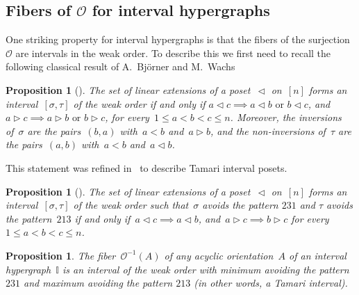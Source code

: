 \documentclass{amsart}
\newtheorem{proposition}[theorem]{Proposition}
\theoremstyle{definition}
\newcommand{\less}{\vartriangleleft} %
\newcommand{\more}{\vartriangleright} %
\newcommand{\Or}{\mathcal O}  %
\newcommand{\II}{\mathbb I} %
\begin{document}

\subsection{Fibers of $\Or$ for interval hypergraphs} 
\label{subsec:preimageI}

One striking property for interval hypergraphs is that the fibers of the surjection~$\Or$ are intervals in the weak order.
To describe this we first need to recall the following classical result of A.~Bj\"orner and M.~Wachs~\cite[Thm.~6.8]{BjornerWachs}

\begin{proposition}[{\cite[Thm.~6.8]{BjornerWachs}}]
\label{prop:WOIP}
The set of linear extensions of a poset~$\less$ on~$[n]$ forms an interval~$[\sigma, \tau]$ of the weak order if and only if ${a \less c \implies a \less b \text{ or } b \less c}$, and~${a \more c \implies a \more b \text{ or } b \more c}$, for every~$1 \le a < b < c \le n$.
Moreover, the inversions of~$\sigma$ are the pairs~$(b,a)$ with~$a < b$ and~$a \more b$, and the non-inversions of~$\tau$ are the pairs~$(a,b)$ with~$a < b$ and~$a \less b$.
\end{proposition}

This statement was refined in~\cite{ChatelPilaudPons} to describe Tamari interval posets.

\begin{proposition}[{\cite[Coro.~2.24]{ChatelPilaudPons}}]
\label{prop:TOIP}
The set of linear extensions of a poset~$\less$ on~$[n]$ forms an interval~$[\sigma, \tau]$ of the weak order such that~$\sigma$ avoids the pattern $231$ and $\tau$ avoids the pattern~$213$ if and only if~${a \less c \implies a \less b}$, and~$a \more c \implies b \more c$ for every~$1 \le a < b < c \le n$.
\end{proposition}

\begin{proposition}
\label{prop:preimageI}
The fiber~$\Or^{-1}(A)$ of any acyclic orientation~$A$ of an interval hypergraph~$\II$ is an interval of the weak order with minimum avoiding the pattern $231$ and maximum avoiding the pattern $213$ (in other words, a Tamari interval).
\end{proposition}
\end{document}
